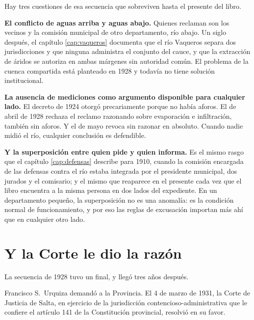 Hay tres cuestiones de esa secuencia que sobreviven hasta el presente del libro.

\textbf{El conflicto de aguas arriba y aguas abajo.} Quienes reclaman son los vecinos y la
comisión municipal de otro departamento, río abajo. Un siglo después, el capítulo \ref{cap:vaqueros}
documenta que el río Vaqueros separa dos jurisdicciones y que ninguna administra el
conjunto del cauce, y que la extracción de áridos se autoriza en ambas márgenes sin
autoridad común. El problema de la cuenca compartida está planteado en 1928 y todavía no
tiene solución institucional.

\textbf{La ausencia de mediciones como argumento disponible para cualquier lado.} El decreto
de 1924 otorgó precariamente porque no había aforos. El de abril de 1928 rechaza el reclamo
razonando sobre evaporación e infiltración, también sin aforos. Y el de mayo revoca sin
razonar en absoluto. Cuando nadie midió el río, cualquier conclusión es defendible.

\textbf{Y la superposición entre quien pide y quien informa.} Es el mismo rasgo que el capítulo \ref{cap:defensas} describe para 1910, cuando la comisión encargada de las defensas contra el
río estaba integrada por el presidente municipal, dos jurados y el comisario; y el mismo
que reaparece en el presente cada vez que el libro encuentra a la misma persona en dos
lados del expediente. En un departamento pequeño, la superposición no es una anomalía: es
la condición normal de funcionamiento, y por eso las reglas de excusación importan más ahí
que en cualquier otro lado.

\section{Y la Corte le dio la razón}

La secuencia de 1928 tuvo un final, y llegó tres años después.

Francisco S.\ Urquiza demandó a la Provincia. El 4 de marzo de 1931, la Corte de Justicia de
Salta, en ejercicio de la jurisdicción contencioso-administrativa que le confiere el
artículo 141 de la Constitución provincial, resolvió en su favor.

